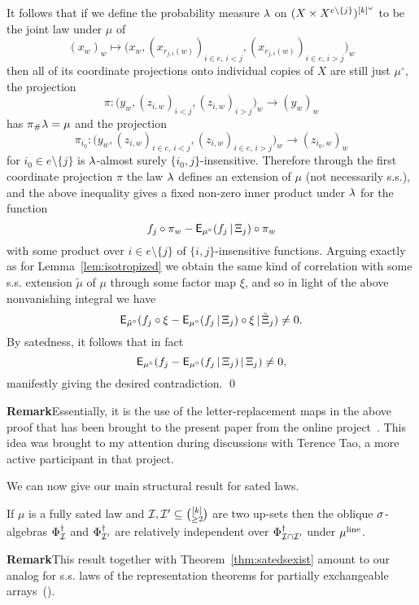 \documentclass[11pt]{article}
\begin{document}
It follows that if we define the probability measure $\lambda$ on
$(X\times X^{e\setminus \{j\}})^{[k]^\omega}$ to be the joint law under
$\mu$ of
\[(x_w)_w \mapsto \big(x_w,(x_{r_{j,i}(w)})_{i \in e,\,i < j},(x_{r_{j,i}(w)})_{i \in e,\,i > j}\big)_w\]
then all of its coordinate projections onto individual copies of $X$
are still just $\mu^\circ$, the projection
\[\pi:\big(y_w,(z_{i,w})_{i < j},(z_{i,w})_{i > j}\big)_w\to (y_w)_w\]
has $\pi_\#\lambda = \mu$ and the projection
\[\pi_{i_0}:\big(y_w,(z_{i,w})_{i \in e,\,i < j},(z_{i,w})_{i \in e,\,i > j}\big)_w\to (z_{i_0,w})_w\]
for $i_0 \in e\setminus\{j\}$ is $\lambda$-almost surely
$\{i_0,j\}$-insensitive. Therefore through the first coordinate
projection $\pi$ the law $\lambda$ defines an extension of $\mu$ (not
necessarily s.s.), and the above inequality gives a fixed non-zero
inner product under $\lambda$ for the function
\[f_j\circ\pi_w -
\mathsf{E}_{\mu^\circ}(f_j\,|\,\Xi_j)\circ\pi_w\]
with some product over $i\in e\setminus \{j\}$ of $\{i,j\}$-insensitive
functions.  Arguing exactly
as for Lemma~\ref{lem:isotropized} we obtain the same kind of
correlation with some s.s. extension $\tilde{\mu}$ of $\mu$ through
some factor map $\xi$, and so in light of the above nonvanishing
integral we have
\[\mathsf{E}_{\tilde{\mu}^\circ}(f_j\circ\xi -
\mathsf{E}_{\mu^\circ}(f_j\,|\,\Xi_j)\circ\xi\,|\,\tilde{\Xi}_j)\neq 0.\]
By satedness, it follows that in fact
\[\mathsf{E}_{\mu^\circ}(f_j -
\mathsf{E}_{\mu^\circ}(f_j\,|\,\Xi_j)\,|\,\Xi_j)\neq 0,\] manifestly
giving the desired contradiction. \qed

\textbf{Remark}\quad Essentially, it is the use of the
letter-replacement maps in the above proof that has been brought to
the present paper from the online project~\cite{Gow(online)}.  This
idea was brought to my attention during discussions with Terence
Tao, a more active participant in that project. \fin

We can now give our main structural result for sated laws.

\begin{thm}\label{thm:struct}
If $\mu$ is a fully sated law and $\mathcal{I},\mathcal{I}'\subseteq \binom{[k]}{\geq
2}$ are two up-sets then the oblique $\sigma$-algebras $\Phi^\dag_{\mathcal{I}}$
and $\Phi^\dag_{\mathcal{I}'}$ are relatively independent over
$\Phi^\dag_{\mathcal{I}\cap\mathcal{I}'}$ under $\mu^{\mathrm{line}}$.
\end{thm}

\textbf{Remark}\quad This result together with
Theorem~\ref{thm:satedsexist} amount to our analog for s.s. laws of
the representation theorems for partially exchangeable
arrays~(\cite{Kal92}). \fin
\end{document}
